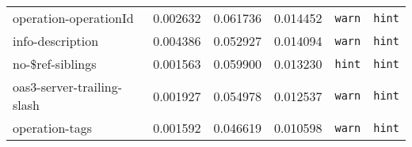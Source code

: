 {\begin{longtable}{lrrrrr}
operation-operationId &  0.002632 &  0.061736 & 0.014452 & \texttt{warn} & \texttt{hint} \\
info-description & 0.004386 &  0.052927 & 0.014094 & \texttt{warn} & \texttt{hint} \\
no-\$ref-siblings &  0.001563 &  0.059900 & 0.013230 & \texttt{hint} & \texttt{hint} \\
oas3-server-trailing-slash & 0.001927 &  0.054978 & 0.012537 & \texttt{warn} & \texttt{hint} \\
operation-tags & 0.001592 &  0.046619 & 0.010598 & \texttt{warn} & \texttt{hint} \\ 
\hline\hline
\end{longtable}
}

